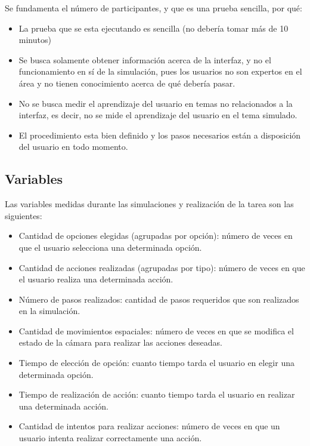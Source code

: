 Se fundamenta el número de participantes, y que es una prueba sencilla, por qué:

\begin{itemize}

\item La prueba que se esta ejecutando es sencilla (no debería tomar más de 10
    minutos) 

\item Se busca solamente obtener información acerca de la interfaz, y no el
    funcionamiento en sí de la simulación, pues los usuarios no son expertos en
    el área y no tienen conocimiento acerca de qué debería pasar. 

\item No se busca medir el aprendizaje del usuario en temas no relacionados a la
    interfaz, es decir, no se mide el aprendizaje del usuario en el tema
    simulado.

\item El procedimiento esta bien definido y los pasos necesarios están a
    disposición del usuario en todo momento.

\end{itemize}

\subsection{Variables}

Las variables medidas durante las simulaciones y realización de la tarea son las
siguientes:


\begin{itemize}

\item Cantidad de opciones elegidas (agrupadas por opción): número de veces en
    que el usuario selecciona una determinada opción.

\item Cantidad de acciones realizadas (agrupadas por tipo): número de veces  en
    que el usuario realiza una determinada acción.

\item Número de pasos realizados: cantidad de pasos requeridos que son
    realizados en la simulación. 

\item Cantidad de movimientos espaciales: número de veces en que se modifica el
    estado de la cámara para realizar las acciones deseadas.

\item Tiempo de elección de opción: cuanto tiempo tarda el usuario en elegir una
    determinada opción.

\item Tiempo de realización de acción: cuanto tiempo tarda el usuario en
    realizar una determinada acción.

\item Cantidad de intentos para realizar acciones: número de veces en que un
    usuario intenta realizar correctamente una acción. 

\end{itemize}

